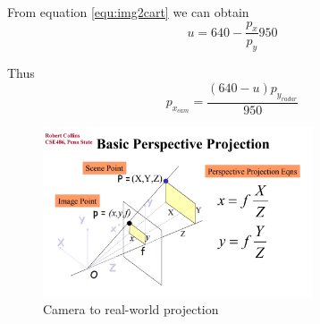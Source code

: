 From equation \ref{equ:img2cart} we can obtain
\begin{equation}\label{equ:2_img2cart2}
    u=640-\frac{p_x}{p_y}950
\end{equation}

Thus
\begin{equation}\label{equ:2_cam_px}
    p_{x_{cam}}=
    \frac
    {(640-u)p_{y_{radar}}}
    {950}
\end{equation}
\begin{figure}[hpbt]
    \centering
    \includegraphics[width=8cm]{Figures/cam_projection.png}%
    \caption{Camera to real-world projection}
    \label{fig:camera_projection}
\end{figure}

